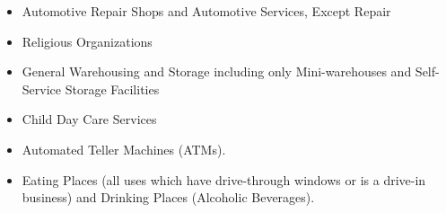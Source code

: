 \begin{itemize}
\item Automotive Repair Shops and Automotive Services, Except Repair 

\item Religious Organizations 

\item General Warehousing and Storage including only Mini-warehouses and
Self-Service Storage Facilities

\item Child Day Care Services 

\item Automated Teller Machines (ATMs).

\item Eating Places (all uses which have drive-through windows or is a drive-in
business) and Drinking Places (Alcoholic Beverages).
\end{itemize}

